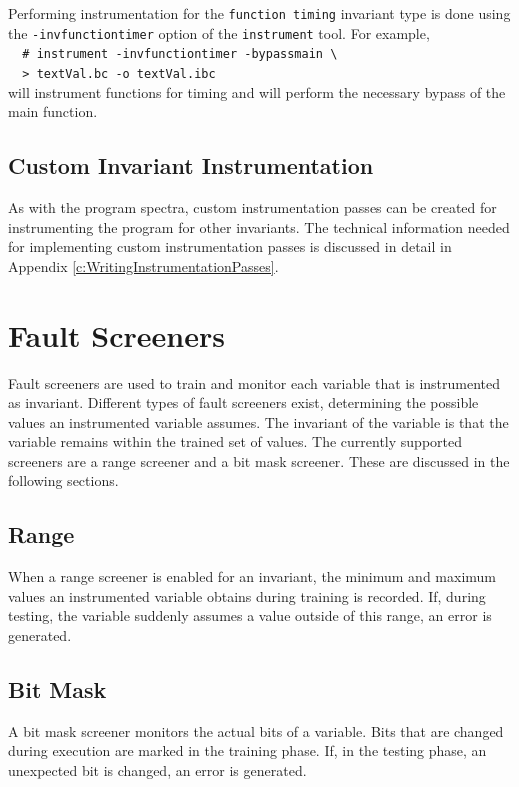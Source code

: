 		Performing instrumentation for the \verb|function timing| invariant type is done using the 
		\verb|-invfunctiontimer| option of the \verb|instrument| tool.
		For example,\\
		\verb|  # instrument -invfunctiontimer -bypassmain \ | \\
		\verb|  > textVal.bc -o textVal.ibc|\\
		will instrument functions for timing and will perform the necessary bypass of the main function.


\subsection{Custom Invariant Instrumentation}

		As with the program spectra, 
		custom instrumentation passes can be created for instrumenting the program for other invariants.
		The technical information needed for implementing custom instrumentation passes 
		is discussed in detail in Appendix \ref{c:WritingInstrumentationPasses}.

		
	
\section{Fault Screeners}

	Fault screeners are used to train and monitor each variable that is instrumented as invariant.
	Different types of fault screeners exist, 
	determining the possible values an instrumented variable assumes.
	The invariant of the variable is that the variable remains within the trained set of values.
	The currently supported screeners are a range screener and a bit mask screener.
	These are discussed in the following sections.

\subsection{Range}

		When a range screener is enabled for an invariant, 
		the minimum and maximum values an instrumented variable obtains during training is recorded.
		If, during testing, the variable suddenly assumes a value outside of this range,
		an error is generated.

\subsection{Bit Mask}

		A bit mask screener monitors the actual bits of a variable.
		Bits that are changed during execution are marked in the training phase.
		If, in the testing phase, an unexpected bit is changed, an error is generated.

